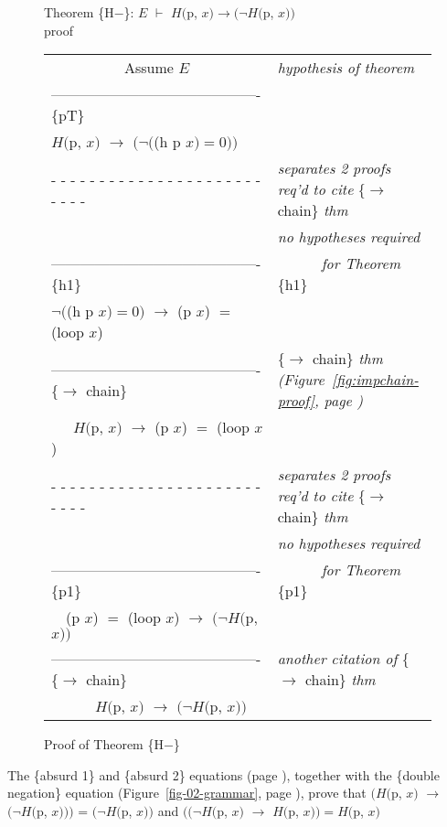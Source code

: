 \begin{figure}
Theorem \{H$-$\}: $E$ $\vdash$ $H($p, $x) \rightarrow(\neg H($p, $x))$~\\
proof
\begin{center}
\begin{tabular}{ll}
~~~~~~~~~~Assume $E$                                &\emph{hypothesis of theorem}\\
-------------------------------------------\{pT\}   &\\
$H($p, $x)$ $\rightarrow$ $(\neg($(h p $x) = 0))$   &\\
 - - - - - - - - - - - - - - - - - - - - - - - - - -&\emph{separates 2 proofs req'd to cite} \{$\rightarrow$ chain\} \emph{thm}\\
                                                    &\emph{no hypotheses required}\\
-------------------------------------------\{h1\}   &~~~~~~\emph{for Theorem} \{h1\}\\
$\neg($(h p $x)=0)$ $\rightarrow$ (p $x$) $=$ (loop $x$)&\\
-------------------------------------------\{$\rightarrow$ chain\} &\{$\rightarrow$ chain\} \emph{thm (Figure~\ref{fig:impchain-proof}, page \pageref{fig:impchain-proof})}\\
~~~$H($p, $x)$ $\rightarrow$ (p $x$) $=$ (loop $x$) &\\
 - - - - - - - - - - - - - - - - - - - - - - - - - -&\emph{separates 2 proofs req'd to cite} \{$\rightarrow$ chain\} \emph{thm}\\
                                                    &\emph{no hypotheses required}\\
-------------------------------------------\{p1\}   &~~~~~~\emph{for Theorem} \{p1\}\\
~~(p $x$) $=$ (loop $x$) $\rightarrow$ $(\neg H($p, $x))$ &\\
-------------------------------------------\{$\rightarrow$ chain\} &\emph{another citation of} \{$\rightarrow$ chain\} \emph{thm}\\
~~~~~~$H($p, $x)$ $\rightarrow$ $(\neg H($p, $x))$  &\\
\end{tabular}

\end{center}
\caption{Proof of Theorem \{H$-$\}}
\label{fig:hminus-thm-proof}
\end{figure}

The \{absurd 1\} and \{absurd 2\} equations (page \pageref{absurd-1}),
together with the \{double negation\} equation (Figure~\ref{fig-02-grammar}, page \pageref{fig-02-grammar}),
prove that $(H($p, $x)$ $\rightarrow$ $(\neg H($p, $x)))$ = $(\neg H($p, $x))$ and
$((\neg H($p, $x)$ $\rightarrow$ $H($p, $x)) = H($p, $x)$

